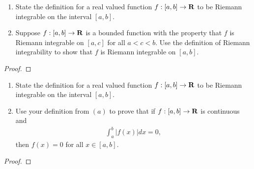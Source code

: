 \documentclass[11pt,twoside,openany]{memoir}
\begin{document}
\newpage
\fancyhead[L]{\scalebox{0.9}{Integration}}
\fancyhead[R]{\scalebox{0.9}{Appeared on: F18}}
\begin{problem}
    \phantom{a}
    \begin{enumerate}[label = (\arabic*)]
        \item State the definition for a real valued function $f:[a,b] \rightarrow \mathbf{R}$ to be Riemann integrable on the interval $[a,b]$.
        \item Suppose $f:[a,b] \rightarrow \mathbf{R}$ is a bounded function with the property that $f$ is Riemann integrable on $[a,c]$ for all $a < c < b$. Use the definition of Riemann integrability to show that $f$ is Riemann integrable on $[a,b]$.
    \end{enumerate}
\end{problem}
\begin{proof}
\end{proof}

\newpage
\fancyhead[L]{\scalebox{0.9}{Integration}}
\fancyhead[R]{\scalebox{0.9}{Appeared on: S18}}
\begin{problem}
    \phantom{a}
    \begin{enumerate}[label = (\arabic*)]
        \item State the definition for a real valued function $f:[a,b] \rightarrow \mathbf{R}$ to be Riemann integrable on the interval $[a,b]$.
        \item Use your definition from $(a)$ to prove that if $f:[a,b] \rightarrow \mathbf{R}$ is continuous and
            \begin{equation*}
            \begin{split}
                \int_a^b |f(x)| dx = 0,
            \end{split}
            \end{equation*}
        then $f(x) = 0$ for all $x \in [a,b]$.
    \end{enumerate}
\end{problem}
\begin{proof}
\end{proof}
\end{document}
